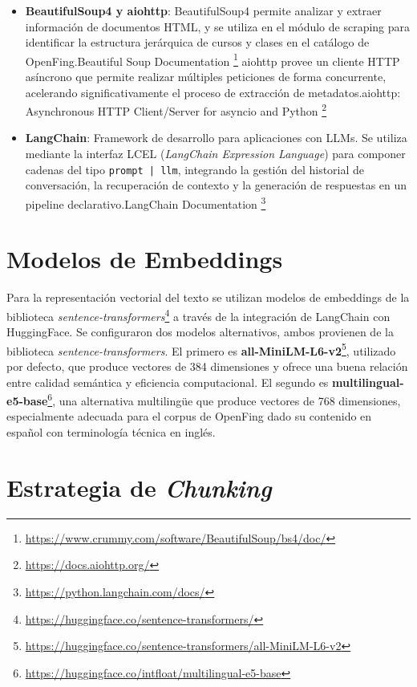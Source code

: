 \begin{itemize}
    \item \textbf{BeautifulSoup4 y aiohttp}: BeautifulSoup4 permite analizar y extraer información de documentos HTML, y se utiliza en el módulo de scraping para identificar la estructura jerárquica de cursos y clases en el catálogo de OpenFing.Beautiful Soup Documentation \footnote{\url{https://www.crummy.com/software/BeautifulSoup/bs4/doc/}} aiohttp provee un cliente HTTP asíncrono que permite realizar múltiples peticiones de forma concurrente, acelerando significativamente el proceso de extracción de metadatos.aiohttp: Asynchronous HTTP Client/Server for asyncio and Python \footnote{\url{https://docs.aiohttp.org/}}

    \item \textbf{LangChain}: Framework de desarrollo para aplicaciones con LLMs. Se utiliza mediante la interfaz LCEL (\textit{LangChain Expression Language}) para componer cadenas del tipo \texttt{prompt | llm}, integrando la gestión del historial de conversación, la recuperación de contexto y la generación de respuestas en un pipeline declarativo.LangChain Documentation \footnote{\url{https://python.langchain.com/docs/}}
\end{itemize}


\section{Modelos de Embeddings}
\label{section:5-Embeddings}

Para la representación vectorial del texto se utilizan modelos de embeddings de la biblioteca \textit{sentence-transformers}\footnote{\url{https://huggingface.co/sentence-transformers/}} \cite{reimers-2019-sentence-bert} a través de la integración de LangChain con HuggingFace. Se configuraron dos modelos alternativos, ambos provienen de la biblioteca \textit{sentence-transformers}. El primero es \textbf{all-MiniLM-L6-v2}\footnote{\url{https://huggingface.co/sentence-transformers/all-MiniLM-L6-v2}}, utilizado por defecto, que produce vectores de 384 dimensiones y ofrece una buena relación entre calidad semántica y eficiencia computacional. El segundo es \textbf{multilingual-e5-base}\footnote{\url{https://huggingface.co/intfloat/multilingual-e5-base}}, una alternativa multilingüe que produce vectores de 768 dimensiones, especialmente adecuada para el corpus de OpenFing dado su contenido en español con terminología técnica en inglés.

\section{Estrategia de \textit{Chunking}}
\label{section:5-Chunking}

